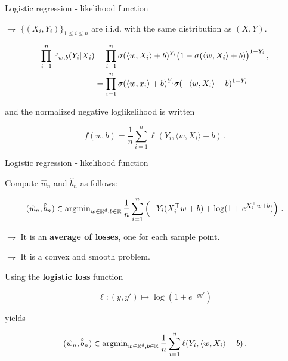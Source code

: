 \documentclass[xcolor={usenames,dvipsnames},handout]{beamer}
\begin{document}
\begin{frame}{Logistic regression - likelihood function}

$\rightharpoondown$   $\{(X_i,Y_i)\}_{1\leqslant i\leqslant n}$ are \alert{i.i.d. with the same distribution as $(X,Y)$}.

\vspace{.3cm}


{\bf{}}

\begin{align*}
 \prod_{i=1}^n \P_{w,b}(Y_i | X_i) &= \prod_{i=1}^n \sigma(\langle w,X_i \rangle + b)^{Y_i} \big(1 - 
\sigma(\langle w,X_i \rangle + b) \big)^{1 - Y_i}\,, \\
& = \prod_{i=1}^n \sigma(\langle w,x_i \rangle + b)^{Y_i} 
\sigma(-\langle w,X_i \rangle - b)^{1 - Y_i}
\end{align*}
\smallskip

and the \alert{normalized negative loglikelihood} is written
\smallskip

\begin{equation*}
f(w,b) = \frac{1}{n}\sum_{i=1}^n \ell(Y_i, \langle w,X_i \rangle + b)\,.
\end{equation*}
\end{frame}


\begin{frame}{Logistic regression - likelihood function}
		
Compute $\hat w_n$ and $\hat b_n$ as follows:

\begin{align*}
(\hat w_n, \hat b_n) \in \argmin_{w \in \R^d, b \in \R}
\frac 1n \sum_{i=1}^n\left(-Y_i (X_i^\top w+ b) +  \log(1+ e^{X_i^\top w + b})\right)\,.
\end{align*}

\vspace{.3cm}

$\rightharpoondown$ It is an \textbf{average of losses}, one for each sample point.

$\rightharpoondown$ It is a \alert{convex and smooth problem}.


\medskip

Using the \textbf{\alert{logistic loss}} function
\smallskip 

\begin{equation*}
\ell: (y, y') \mapsto \log(1 + e^{-y y'}) 
\end{equation*}

yields

\begin{equation*}
(\hat w_n, \hat b_n) \in \argmin_{w \in \R^d, b \in \R}
\frac 1n \sum_{i=1}^n \ell(Y_i, \langle w,X_i \rangle + b)\,.
\end{equation*}
\end{frame}
\end{document}
